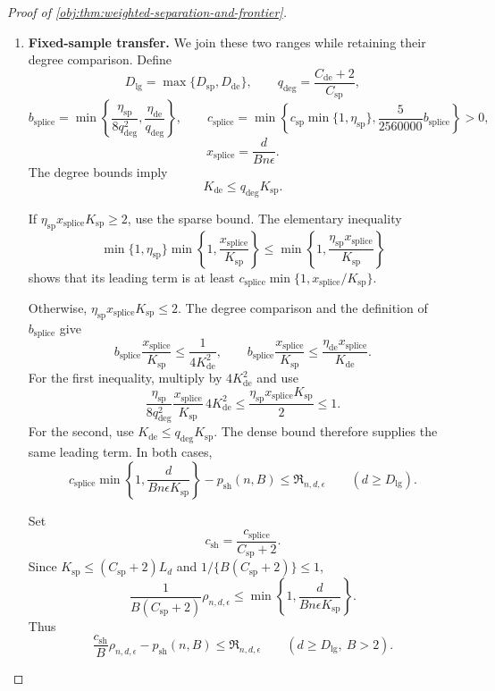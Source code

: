 \begin{proof}[Proof of \cref{obj:thm:weighted-separation-and-frontier}]
\begin{enumerate}
\item
\textbf{Fixed-sample transfer.}\quad
We join these two ranges while retaining their degree comparison. Define
\[
D_{\mathrm{lg}}=\max\{D_{\mathrm{sp}},D_{\mathrm{de}}\},
\qquad
q_{\mathrm{deg}}=\frac{C_{\mathrm{de}}+2}{C_{\mathrm{sp}}},
\]
\[
b_{\mathrm{splice}}
=\min\left\{
\frac{\eta_{\mathrm{sp}}}{8q_{\mathrm{deg}}^2},
\frac{\eta_{\mathrm{de}}}{q_{\mathrm{deg}}}
\right\},
\qquad
c_{\mathrm{splice}}
=\min\left\{
c_{\mathrm{sp}}\min\{1,\eta_{\mathrm{sp}}\},
\frac5{2560000}b_{\mathrm{splice}}
\right\}>0,
\]
\[
x_{\mathrm{splice}}=\frac d{Bn\epsilon}.
\]
The degree bounds imply
\[
K_{\mathrm{de}}\le q_{\mathrm{deg}}K_{\mathrm{sp}}.
\]

If \(\eta_{\mathrm{sp}}x_{\mathrm{splice}}K_{\mathrm{sp}}\ge2\), use the sparse bound. The elementary inequality
\[
\min\{1,\eta_{\mathrm{sp}}\}
\min\left\{1,\frac{x_{\mathrm{splice}}}{K_{\mathrm{sp}}}\right\}
\le
\min\left\{1,
\frac{\eta_{\mathrm{sp}}x_{\mathrm{splice}}}{K_{\mathrm{sp}}}\right\}
\]
shows that its leading term is at least
\(c_{\mathrm{splice}}\min\{1,x_{\mathrm{splice}}/K_{\mathrm{sp}}\}\).

Otherwise,
\(\eta_{\mathrm{sp}}x_{\mathrm{splice}}K_{\mathrm{sp}}\le2\).
The degree comparison and the definition of \(b_{\mathrm{splice}}\) give
\[
b_{\mathrm{splice}}
\frac{x_{\mathrm{splice}}}{K_{\mathrm{sp}}}
\le\frac1{4K_{\mathrm{de}}^2},
\qquad
b_{\mathrm{splice}}
\frac{x_{\mathrm{splice}}}{K_{\mathrm{sp}}}
\le\frac{\eta_{\mathrm{de}}x_{\mathrm{splice}}}{K_{\mathrm{de}}}.
\]
For the first inequality, multiply by \(4K_{\mathrm{de}}^2\) and use
\[
\frac{\eta_{\mathrm{sp}}}{8q_{\mathrm{deg}}^2}
\frac{x_{\mathrm{splice}}}{K_{\mathrm{sp}}}
\,4K_{\mathrm{de}}^2
\le\frac{\eta_{\mathrm{sp}}x_{\mathrm{splice}}K_{\mathrm{sp}}}{2}
\le1.
\]
For the second, use
\(K_{\mathrm{de}}\le q_{\mathrm{deg}}K_{\mathrm{sp}}\).
The dense bound therefore supplies the same leading term. In both cases,
\[
c_{\mathrm{splice}}
\min\left\{1,\frac d{Bn\epsilon K_{\mathrm{sp}}}\right\}
-p_{\mathrm{sh}}(n,B)
\le\mathfrak R_{n,d,\epsilon}
\qquad(d\ge D_{\mathrm{lg}}).
\]

Set
\[
c_{\mathrm{sh}}=\frac{c_{\mathrm{splice}}}{C_{\mathrm{sp}}+2}.
\]
Since \(K_{\mathrm{sp}}\le(C_{\mathrm{sp}}+2)L_d\) and
\(1/\{B(C_{\mathrm{sp}}+2)\}\le1\),
\[
\frac1{B(C_{\mathrm{sp}}+2)}\rho_{n,d,\epsilon}
\le
\min\left\{1,\frac d{Bn\epsilon K_{\mathrm{sp}}}\right\}.
\]
Thus
\[
\frac{c_{\mathrm{sh}}}{B}\rho_{n,d,\epsilon}
-p_{\mathrm{sh}}(n,B)
\le\mathfrak R_{n,d,\epsilon}
\qquad(d\ge D_{\mathrm{lg}},\ B>2).
\]


\end{enumerate}
\end{proof}
